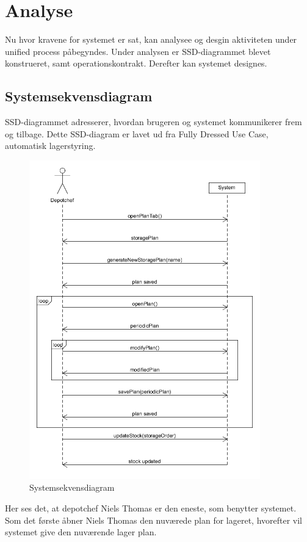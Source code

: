 \chapter{Analyse}\label{ch:analyse}

Nu hvor kravene for systemet er sat, kan analysee og desgin aktiviteten under unified process påbegyndes. Under analysen er SSD-diagrammet blevet konstrueret, samt operationskontrakt. Derefter kan systemet designes. 

\section{Systemsekvensdiagram}
SSD-diagrammet adresserer, hvordan brugeren og systemet kommunikerer frem og tilbage. Dette SSD-diagram er lavet ud fra Fully Dressed Use Case, automatisk lagerstyring.

\begin{figure}[H]
    \centering
    \includegraphics[width=100mm]{figures/analyse/SSD.png}
    \caption{Systemsekvensdiagram}
    \label{fig:ssd}
\end{figure}

Her ses det, at depotchef Niels Thomas er den eneste, som benytter systemet. Som det første åbner Niels Thomas den nuværede plan for lageret, hvorefter vil systemet give den nuværende lager plan. 


